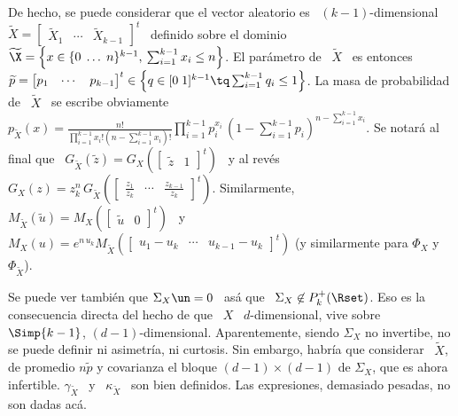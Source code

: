 De hecho, se puede considerar que el vector aleatorio es \ $(k-1)$-dimensional \
$\widetilde{X}     =    \begin{bmatrix}     \widetilde{X}_1    &     \cdots    &
  \widetilde{X}_{k-1}   \end{bmatrix}^t$   \  definido   sobre   el  dominio   \
$\widetilde{\X} = \left\{ x \in \{ 0 \; \ldots \; n\}^{k-1}, \: \sum_{i=1}^{k-1}
  x_i  \le n  \right\}$. El  par\'ametro de  \ $\widetilde{X}$  \ es  entonces \
$\widetilde{p}     =     \protect\begin{bmatrix}      p_1     &     \cdots     &
  p_{k-1}  \end{bmatrix}^t\protect  \in  \left\{   q  \in  [0  \;  1]^{k-1}  \tq
  \sum_{i=1}^{k-1}  q_i  \le  1  \right\}$.    La  masa  de  probabilidad  de  \
$\widetilde{X}$   \   se    escribe   obviamente   \   $p_{\widetilde{X}}(x)   =
\frac{n!}{\prod_{i=1}^{k-1} x_i!   (n-\sum_{i=1}^{k-1} x_i)!}  \prod_{i=1}^{k-1}
p_i^{x_i} \, \left( 1  - \sum_{i=1}^{k-1} p_i \right)^{n-\sum_{i=1}^{k-1} x_i}$.
Se  notar\'a al  final que  \ $G_{\widetilde{X}}\left(  \widetilde{z}  \right) =
G_X\left(  \begin{bmatrix} \widetilde{z}  & 1  \end{bmatrix}^t \right)$  \  y al
rev\'es   \   $G_X(z)  =   z_k^n   \,  G_{\widetilde{X}}\left(   \begin{bmatrix}
    \frac{z_1}{z_k}  & \cdots  &  \frac{z_{k-1}}{z_k} \end{bmatrix}^t  \right)$.
Similarmente,    \     $M_{\widetilde{X}}\left(    \widetilde{u}    \right)    =
M_X\left(  \begin{bmatrix} \widetilde{u}  &  0 \end{bmatrix}^t  \right)$  \ y  \
$M_X(u)  = e^{n  \, u_k}  M_{\widetilde{X}}\left(  \begin{bmatrix} u_1  - u_k  &
    \cdots  &  u_{k-1}  -  u_k  \end{bmatrix}^t \right)$  (y  similarmente  para
$\Phi_X$ y $\Phi_{\widetilde{X}}$).

Se puede ver  tambi\'en que $\Sigma_X \un  = 0$ \ as\'a que  \ $\Sigma_X \not\in
P_k^+(\Rset)$.   Eso  es la  consecuencia  directa  del hecho  de  que  \ $X$  \
$d$-dimensional, vive sobre  \ $\Simp{k-1}$, $(d-1)$-dimensional. Aparentemente,
siendo  $\Sigma_X$  no  invertibe,  no  se  puede  definir  ni  asimetr\'ia,  ni
curtosis. Sin embargo, habr\'ia que considerar \ $\widetilde{X}$, de promedio $n
\widetilde{p}$ y covarianza el bloque $(d-1) \times (d-1)$ de $\Sigma_X$, que es
ahora infertible. $\gamma_{\widetilde{X}}$ \  y \ $\kappa_{\widetilde{X}}$ \ son
bien definidos. Las expresiones, demasiado pesadas, no son dadas ac\'a.

